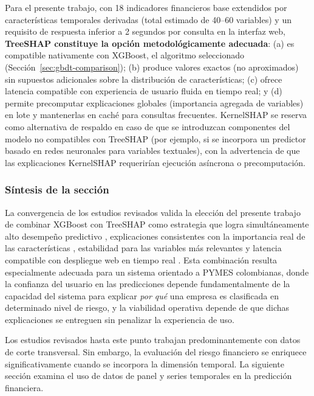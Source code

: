 \documentclass[12pt, letterpaper]{article}
\begin{document}
Para el presente trabajo, con 18 indicadores financieros base extendidos por caracter\'isticas temporales derivadas (total estimado de 40--60 variables) y un requisito de respuesta inferior a 2 segundos por consulta en la interfaz web, \textbf{TreeSHAP constituye la opci\'on metodol\'ogicamente adecuada}: (a) es compatible nativamente con XGBoost, el algoritmo seleccionado (Secci\'on~\ref{sec:gbdt-comparison}); (b) produce valores exactos (no aproximados) sin supuestos adicionales sobre la distribuci\'on de caracter\'isticas; (c) ofrece latencia compatible con experiencia de usuario fluida en tiempo real; y (d) permite precomputar explicaciones globales (importancia agregada de variables) en lote y mantenerlas en cach\'e para consultas frecuentes. KernelSHAP se reserva como alternativa de respaldo en caso de que se introduzcan componentes del modelo no compatibles con TreeSHAP (por ejemplo, si se incorpora un predictor basado en redes neuronales para variables textuales), con la advertencia de que las explicaciones KernelSHAP requerir\'ian ejecuci\'on as\'incrona o precomputaci\'on.

\subsubsection{S\'intesis de la secci\'on}

La convergencia de los estudios revisados valida la elecci\'on del presente trabajo de combinar XGBoost con TreeSHAP como estrategia que logra simult\'aneamente alto desempe\~no predictivo \citep{Dasilas2024, Bussmann2020}, explicaciones consistentes con la importancia real de las caracter\'isticas \citep{Pathi2025}, estabilidad para las variables m\'as relevantes \citep{Lin2024} y latencia compatible con despliegue web en tiempo real \citep{LundbergTreeSHAP2020, Deng2024}. Esta combinaci\'on resulta especialmente adecuada para un sistema orientado a PYMES colombianas, donde la confianza del usuario en las predicciones depende fundamentalmente de la capacidad del sistema para explicar \textit{por qu\'e} una empresa es clasificada en determinado nivel de riesgo, y la viabilidad operativa depende de que dichas explicaciones se entreguen sin penalizar la experiencia de uso.

Los estudios revisados hasta este punto trabajan predominantemente con datos de corte transversal. Sin embargo, la evaluaci\'on del riesgo financiero se enriquece significativamente cuando se incorpora la dimensi\'on temporal. La siguiente secci\'on examina el uso de datos de panel y series temporales en la predicci\'on financiera.
\end{document}
